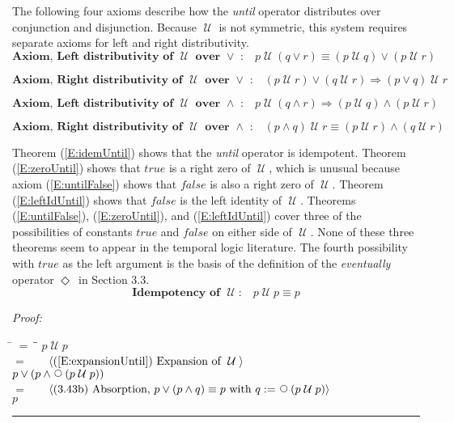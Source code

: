 \documentclass[fleqn, leqno]{article}
\newcommand{\lgap}{2pt}                             %
\newcommand{\mymathindent}{24pt}                    %
\newcommand{\impl}{\ensuremath{\Rightarrow}}        %
\newcommand{\Until}{\;\mathcal{U}\;}
\newcommand{\Next}{\;\,\text{\raisebox{3.5pt}{\circle{6}}}}
\newcommand{\Event}{\Diamond\,}
\newcommand{\myqed}{\rule[-.23ex]{1.2ex}{2.0ex}}
\newcommand{\myqedtab}{\hspace{388.5pt}}              %
\newcommand{\firstspacer}{\vspace{-26pt}}
\newcommand{\Gll} {\langle}                         %
\newcommand{\Ggg} {\rangle}                         %
\newcommand{\Hint}[1]     {\ \ \ $\Gll              \mbox{#1} \Ggg$ }   %
\begin{document}
The following four axioms describe how the \textit{until} operator distributes over conjunction and disjunction.
Because $\Until$ is not symmetric, this system requires separate axioms for left and right distributivity.
\begin{equation}\label{E:untilOrEquiv}
\textbf{Axiom, Left distributivity of $\Until$ over $\lor$ :}\quad p \Until (q \lor r) \equiv (p \Until q) \lor (p \Until r)
\end{equation}

\firstspacer

\begin{equation}\label{E:untilOrImp}
\textbf{Axiom, Right distributivity of $\Until$ over $\lor$ :}\quad (p \Until r) \lor (q \Until r) \impl (p \lor q) \Until r
\end{equation}

\firstspacer

\begin{equation}\label{E:untilAndImp}
\textbf{Axiom, Left distributivity of $\Until$ over $\land$ :}\quad p \Until (q \land r) \impl (p \Until q) \land (p \Until r)
\end{equation}

\firstspacer

\begin{equation}\label{E:untilAndEquiv}
\textbf{Axiom, Right distributivity of $\Until$ over $\land$ :}\quad (p \land q) \Until r \equiv (p \Until r) \land (q \Until r)
\end{equation}

Theorem (\ref{E:idemUntil}) shows that the \textit{until} operator is idempotent.
Theorem (\ref{E:zeroUntil}) shows that $true$ is a right zero of $\Until$, which is unusual because
axiom (\ref{E:untilFalse}) shows that $false$ is also a right zero of $\Until$.
Theorem (\ref{E:leftIdUntil}) shows that $false$ is the left identity of $\Until$.
Theorems (\ref{E:untilFalse}), (\ref{E:zeroUntil}), and (\ref{E:leftIdUntil}) cover three of the
possibilities of constants $true$ and $false$ on either side of $\Until$.
None of these three theorems seem to appear in the temporal logic literature.
The fourth possibility with $true$ as the left argument is the basis of the definition of the \textit{eventually}
operator $\Event$ in Section 3.3.
\begin{equation}\label{E:idemUntil}
\textbf{Idempotency of $\Until$:}\quad p \Until p \equiv p
\end{equation}

\emph{Proof:}
\begin{tabbing}
\hspace{\mymathindent} \= $= \;$ \= \myqedtab \= \kill
  \> \>   $p \Until p$\\[\lgap]
  \> $=$  \>  \Hint{(\ref{E:expansionUntil}) Expansion of $\Until$}\\[\lgap]
  \> \>   $p \lor (p \land \Next(p \Until p))$\\[\lgap]
  \> $=$  \>  \Hint{(3.43b) Absorption, $p \lor (p \land q) \equiv p$ with $q := \Next (p \Until p)$}\\[\lgap]
  \> \>   $p$ \> \myqed
\end{tabbing}
\end{document}
